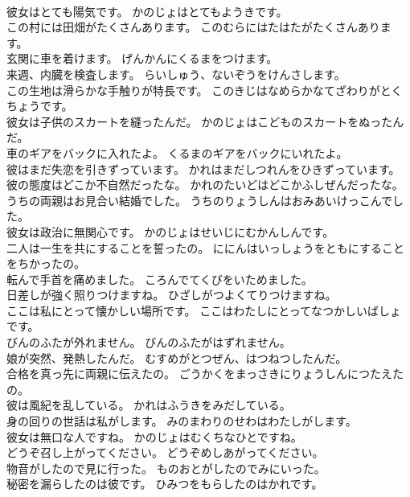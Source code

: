 \documentclass[8pt]{extreport}
\begin{document}
\begin{CJK}{UTF8}{min}
\\	彼女はとても陽気です。	かのじょはとてもようきです。 
\\	この村には田畑がたくさんあります。	このむらにはたはたがたくさんあります。 
\\	玄関に車を着けます。	げんかんにくるまをつけます。 
\\	来週、内臓を検査します。	らいしゅう、ないぞうをけんさします。 
\\	この生地は滑らかな手触りが特長です。	このきじはなめらかなてざわりがとくちょうです。 
\\	彼女は子供のスカートを縫ったんだ。	かのじょはこどものスカートをぬったんだ。 
\\	車のギアをバックに入れたよ。	くるまのギアをバックにいれたよ。 
\\	彼はまだ失恋を引きずっています。	かれはまだしつれんをひきずっています。 
\\	彼の態度はどこか不自然だったな。	かれのたいどはどこかふしぜんだったな。 
\\	うちの両親はお見合い結婚でした。	うちのりょうしんはおみあいけっこんでした。 
\\	彼女は政治に無関心です。	かのじょはせいじにむかんしんです。 
\\	二人は一生を共にすることを誓ったの。	ににんはいっしょうをともにすることをちかったの。 
\\	転んで手首を痛めました。	ころんでてくびをいためました。 
\\	日差しが強く照りつけますね。	ひざしがつよくてりつけますね。 
\\	ここは私にとって懐かしい場所です。	ここはわたしにとってなつかしいばしょです。 
\\	びんのふたが外れません。	びんのふたがはずれません。 
\\	娘が突然、発熱したんだ。	むすめがとつぜん、はつねつしたんだ。 
\\	合格を真っ先に両親に伝えたの。	ごうかくをまっさきにりょうしんにつたえたの。 
\\	彼は風紀を乱している。	かれはふうきをみだしている。 
\\	身の回りの世話は私がします。	みのまわりのせわはわたしがします。 
\\	彼女は無口な人ですね。	かのじょはむくちなひとですね。 
\\	どうぞ召し上がってください。	どうぞめしあがってください。 
\\	物音がしたので見に行った。	ものおとがしたのでみにいった。 
\\	秘密を漏らしたのは彼です。	ひみつをもらしたのはかれです。 

\end{CJK}
\end{document}
